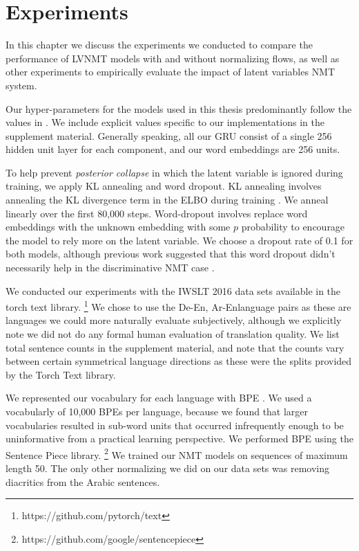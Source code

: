 \chapter{Experiments}

In this chapter we discuss the experiments we conducted to compare the performance of \ac{LVNMT} models with and without normalizing flows, as well as other experiments to empirically evaluate the impact of latent variables \ac{NMT} system.  

Our hyper-parameters for the models used in this thesis predominantly follow the values in \cite{eikema2018AEVNMT}. We include explicit values specific to our implementations in the supplement material. Generally speaking, all our \ac{GRU} consist of a single 256 hidden unit layer for each component, and our word embeddings are 256 units.

To help prevent \textit{posterior collapse} in which the latent variable is ignored during training, we apply KL annealing and word dropout. KL annealing involves annealing the KL divergence term in the \ac{ELBO} during training \cite{bowman2015GeneratingSent}. We anneal  linearly over the first 80,000 steps. Word-dropout involves replace word embeddings with the unknown embedding with some $p$ probability to encourage the model to rely more on the latent variable. We choose a dropout rate of 0.1 for both models, although previous work suggested that this word dropout didn't necessarily help in the discriminative \ac{NMT} case \cite{harshil2018GNMT}. 

We conducted our experiments with the IWSLT 2016 data sets available in the torch text library. \footnote{https://github.com/pytorch/text} We chose to use the De-En, Ar-Enlanguage pairs as these are languages we could more naturally evaluate subjectively, although we explicitly note we did not do any formal human evaluation of translation quality. We list total sentence counts in the supplement material, and note that the counts vary between certain symmetrical language directions as these were the splits provided by the Torch Text library. 

We represented our vocabulary for each language with \ac{BPE} \cite{sennrich2015NMTRarwordsBPE}. We used a vocabularly of 10,000 \ac{BPE}s per language, because we found that larger vocabularies resulted in sub-word units that occurred infrequently enough to be uninformative from a practical learning perspective. We performed \ac{BPE} using the Sentence Piece library. \footnote{https://github.com/google/sentencepiece} We trained our \ac{NMT} models on sequences of maximum length 50. The only other normalizing we did on our data sets was removing diacritics from the Arabic sentences. 

